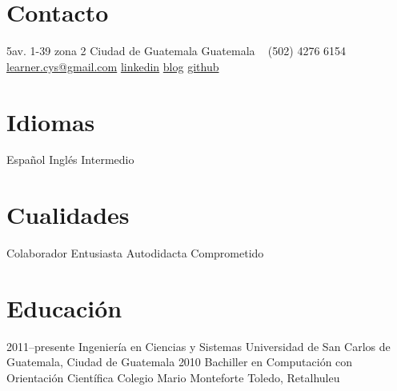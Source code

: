 \documentclass[]{friggeri-cv} %
\begin{document}


\begin{aside} %
\section{Contacto}
5av. 1-39 zona 2
Ciudad de Guatemala
Guatemala
~
 (502) 4276 6154
~
\href{mailto:learner.cys@gmail.com}{learner.cys@gmail.com}
\href{https://www.linkedin.com/pub/carlos-hern\%C3\%A1ndez/87/1b1/157}{linkedin}
\href{http://learnercys.wordpress.com/}{blog}
\href{https://github.com/learnercys}{github}
\section{Idiomas}
Español
Inglés Intermedio 
\section{Cualidades}
Colaborador
Entusiasta
Autodidacta
Comprometido
\end{aside}


\section{Educación}

\begin{entrylist}
\entry
{2011--presente}
{Ingeniería {\normalfont en Ciencias y Sistemas}}
{Universidad de San Carlos de Guatemala, Ciudad de Guatemala	}
{}
\entry
{2010}
{Bachiller {\normalfont en Computación con Orientación Científica}}
{Colegio Mario Monteforte Toledo, Retalhuleu}
{}
\end{entrylist}

\end{document}
